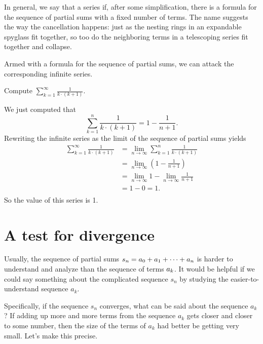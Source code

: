 In general, we say that a series
 if, after some simplification, there is a formula for
the sequence of partial sums with a fixed number of terms.  The name
suggests the way the cancellation happens: just as the nesting rings
in an expandable spyglass fit together, so too do the neighboring
terms in a telescoping series fit together and collapse.

Armed with a formula for the sequence of partial sums, we can attack the corresponding infinite series.

\begin{example}
Compute $\sum_{k=1}^\infty \frac{1}{k \cdot (k+1)}$.
\end{example}
\begin{solution}
We just computed that
$$
\sum_{k=1}^n \frac{1}{k \cdot (k+1)} = 1 - \frac{1}{n+1}.
$$
Rewriting the infinite series as the limit of the sequence of partial sums yields
\begin{align*}
\sum_{k=1}^\infty \frac{1}{k \cdot (k+1)} &= \lim_{n \to \infty} \sum_{k=1}^n \frac{1}{k \cdot (k+1)} \\
&= \lim_{n \to \infty} \left( 1 - \frac{1}{n+1} \right) \\
&= \lim_{n \to \infty} 1 - \lim_{n \to \infty} \frac{1}{n+1} \\
&= 1 - 0 = 1.\\
\end{align*}
So the value of this series is 1.
\end{solution}

\section{A test for divergence}
\label{section:nth-term-test}

Usually, the sequence of partial sums $\displaystyle s_n = a_0 + a_1 + \cdots +
a_n$ is harder to understand and analyze than the sequence of terms
$\displaystyle a_k$.  It would be helpful if we could say something about the
complicated sequence $s_n$ by studying the easier-to-understand
sequence $a_k$.

Specifically, if the sequence $s_n$ converges, what can be said about
the sequence $a_k$?  If adding up more and more terms from the
sequence $a_k$ gets closer and closer to some number, then the size of
the terms of $a_k$ had better be getting very small.  Let's make
this precise.

